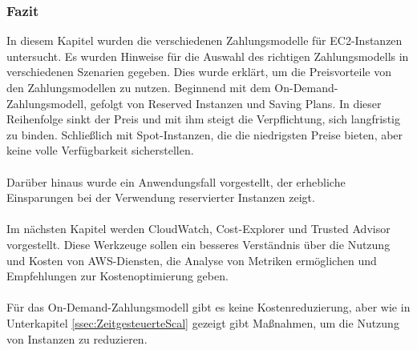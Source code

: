 \subsubsection*{Fazit}%
In diesem Kapitel wurden die verschiedenen Zahlungsmodelle für EC2-Instanzen untersucht. Es wurden Hinweise für die Auswahl des richtigen Zahlungsmodells in verschiedenen Szenarien gegeben. Dies wurde erklärt, um die Preisvorteile von den Zahlungsmodellen zu nutzen. Beginnend mit dem On-Demand-Zahlungsmodell, gefolgt von Reserved Instanzen und Saving Plans. In dieser Reihenfolge sinkt der Preis und mit ihm steigt die Verpflichtung, sich langfristig zu binden. Schließlich mit Spot-Instanzen, die die niedrigsten Preise bieten, aber keine volle Verfügbarkeit sicherstellen. %
\\\\
Darüber hinaus wurde ein Anwendungsfall vorgestellt, der erhebliche Einsparungen bei der Verwendung reservierter Instanzen zeigt.
\\\\
Im nächsten Kapitel werden CloudWatch, Cost-Explorer und Trusted Advisor vorgestellt. Diese Werkzeuge sollen ein besseres Verständnis über die Nutzung und Kosten von AWS-Diensten, die Analyse von Metriken ermöglichen und Empfehlungen zur Kostenoptimierung geben.
\\\\
Für das On-Demand-Zahlungsmodell gibt es keine Kostenreduzierung, aber wie in Unterkapitel \ref{ssec:ZeitgesteuerteScal} gezeigt gibt Maßnahmen, um die Nutzung von Instanzen zu reduzieren. %